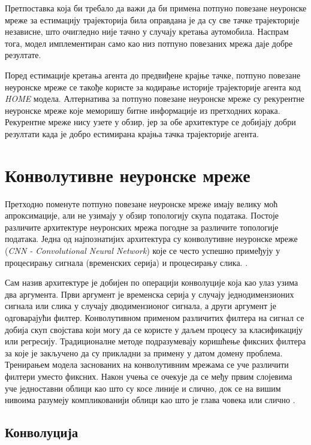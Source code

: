 \documentclass[11pt,oneside]{memoir}
\begin{document}
Претпоставка која би требало да важи да би примена потпуно повезане неуронске мреже за естимацију трајекторија била оправдана је да су све 
тачке трајекторије независне, што очигледно није тачно у случају кретања аутомобила. Наспрам тога, модел имплементиран само као низ
потпуно повезаних мрежа даје добре резултате. 

Поред естимације кретања агента до предвиђене крајње тачке, потпуно повезане неуронске мреже се такође користе за кодирање историје трајекторије
агента код \textit{HOME} модела. Алтернатива за потпуно повезане неуронске мреже су рекурентне неуронске мреже које меморишу битне информације
из претходних корака. Рекурентне мреже нису узете у обзир, јер за обе архитектуре се добијају добри резултати када је добро естимирана
крајња тачка трајекторије агента.

\section{Конволутивне неуронске мреже}

Претходно поменуте потпуно повезане неуронске мреже имају велику моћ апроксимације, али не узимају у обзир топологију скупа података. Постоје
различите архитектуре неуронских мрежа погодне за различите топологије података. Једна од најпознатијих архитектура су
конволутивне неуронске мреже (\textit{CNN - Convolutional Neural Network}) које се често успешно примеђују у процесирању сигнала (временских
серија) и процесирању слика. \cite{deep_learning_goodfellow}.

Сам назив архитектуре је добијен по операцији конволуције која као улаз узима два аргумента. Први аргумент је временска серија у случају
једнодимензионих сигнала или слика у случају дводимензионог сигнала, а други аргумент је одговарајући филтер. Конволутивном применом
различитих филтера на сигнал се добија скуп својстава који могу да се користе у даљем процесу за класификацију или регресију. Традиционалне
методе подразумевају коришћење фиксних филтера за које је закључено да су прикладни за примену у датом домену проблема. Тренирањем модела
заснованих на конволутивним мрежама се уче различити филтери уместо фиксних. Након учења се очекује да се међу првим слојевима
уче једноставни облици као што су косе линије и слично, док се на вишим нивоима разумеју компликованији облици као што је глава човека или
слично \cite{deep_learning_goodfellow, ml_mladen}.

\subsection{Конволуција}
\end{document}
